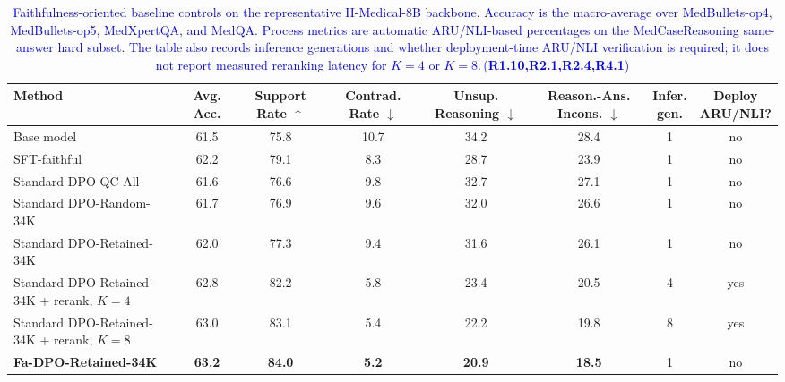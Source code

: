\documentclass[a4paper,fleqn,doubleblind]{cas-sc}
\DeclareRobustCommand{\added}[1]{\textcolor{blue}{#1}}
\DeclareRobustCommand{\revtag}[1]{\textcolor{blue}{\scriptsize\,(\textbf{#1})}}
\begin{document}
\begin{table}[htbp]
    \centering
    \footnotesize
    \setlength{\tabcolsep}{3.2pt}
    \caption{\added{Faithfulness-oriented baseline controls on the representative II-Medical-8B backbone. Accuracy is the macro-average over MedBullets-op4, MedBullets-op5, MedXpertQA, and MedQA. Process metrics are automatic ARU/NLI-based percentages on the MedCaseReasoning same-answer hard subset. The table also records inference generations and whether deployment-time ARU/NLI verification is required; it does not report measured reranking latency for $K=4$ or $K=8$.}\revtag{R1.10,R2.1,R2.4,R4.1}}
    \label{tab:faithfulness_baseline_results}
    \begin{adjustbox}{max width=\textwidth}
    \begin{tabular}{lccccccc}
        \toprule
        \textbf{Method} & \textbf{Avg. Acc.} & \shortstack[c]{\textbf{Support}\\\textbf{Rate $\uparrow$}} & \shortstack[c]{\textbf{Contrad.}\\\textbf{Rate $\downarrow$}} & \shortstack[c]{\textbf{Unsup.}\\\textbf{Reasoning $\downarrow$}} & \shortstack[c]{\textbf{Reason.-Ans.}\\\textbf{Incons. $\downarrow$}} & \shortstack[c]{\textbf{Infer.}\\\textbf{gen.}} & \shortstack[c]{\textbf{Deploy}\\\textbf{ARU/NLI?}} \\
        \midrule
        Base model & 61.5 & 75.8 & 10.7 & 34.2 & 28.4 & 1 & no \\
        SFT-faithful & 62.2 & 79.1 & 8.3 & 28.7 & 23.9 & 1 & no \\
        Standard DPO-QC-All & 61.6 & 76.6 & 9.8 & 32.7 & 27.1 & 1 & no \\
        Standard DPO-Random-34K & 61.7 & 76.9 & 9.6 & 32.0 & 26.6 & 1 & no \\
        Standard DPO-Retained-34K & 62.0 & 77.3 & 9.4 & 31.6 & 26.1 & 1 & no \\
        Standard DPO-Retained-34K + rerank, $K=4$ & 62.8 & 82.2 & 5.8 & 23.4 & 20.5 & 4 & yes \\
        Standard DPO-Retained-34K + rerank, $K=8$ & 63.0 & 83.1 & 5.4 & 22.2 & 19.8 & 8 & yes \\
        \textbf{Fa-DPO-Retained-34K} & \textbf{63.2} & \textbf{84.0} & \textbf{5.2} & \textbf{20.9} & \textbf{18.5} & 1 & no \\
        \bottomrule
    \end{tabular}
    \end{adjustbox}
\end{table}
\end{document}
